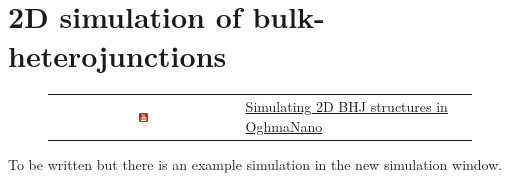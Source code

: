 \chapter{2D simulation of bulk-heterojunctions}
\label{sec:bhj}

\begin{figure}[H]
\begin{tabular}{ c l }

\includegraphics[width=0.05\textwidth]{./images/youtube.png}

&
\href{https://www.youtube.com/watch?v=dlEscq1WSJQ}{Simulating 2D BHJ structures in OghmaNano}

\end{tabular}
\end{figure}

To be written but there is an example simulation in the new simulation window.

